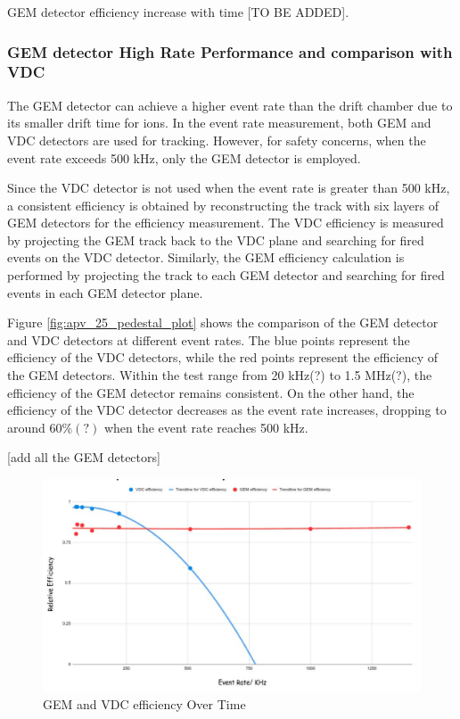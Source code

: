 GEM detector efficiency increase with time [TO BE ADDED]. 

\subsubsection{GEM detector High Rate Performance and comparison  with VDC}

The GEM detector can achieve a higher event rate than the drift chamber due to its smaller drift time for ions. In the event rate measurement, both GEM and VDC detectors are used for tracking. However, for safety concerns, when the event rate exceeds 500 kHz, only the GEM detector is employed.

Since the VDC detector is not used when the event rate is greater than 500 kHz, a consistent efficiency is obtained by reconstructing the track with six layers of GEM detectors for the efficiency measurement. The VDC efficiency is measured by projecting the GEM track back to the VDC plane and searching for fired events on the VDC detector. Similarly, the GEM efficiency calculation is performed by projecting the track to each GEM detector and searching for fired events in each GEM detector plane.

Figure \ref{fig:apv_25_pedestal_plot} shows the comparison of the GEM detector and VDC detectors at different event rates. The blue points represent the efficiency of the VDC detectors, while the red points represent the efficiency of the GEM detectors. Within the test range from 20 kHz(?) to 1.5 MHz(?), the efficiency of the GEM detector remains consistent. On the other hand, the efficiency of the VDC detector decreases as the event rate increases, dropping to around $60\%(?)$ when the event rate reaches 500 kHz. 

[add all the GEM detectors]



\begin{figure}[!htbp]
    \centering
    \includegraphics[width=\textwidth]{images/chap5/gem efficiency over time.png}
    \caption{GEM and VDC efficiency Over Time}
    \label{fig:gem_efficiency_over_time}
\end{figure}
